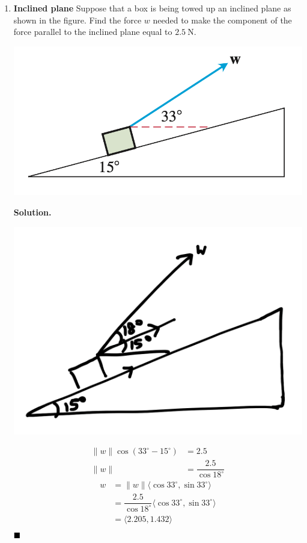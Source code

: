 \documentclass{report}
\begin{document}
\begin{enumerate}
    \item \textbf{Inclined plane} Suppose that a box is being towed up an inclined plane as shown in the figure. Find the force $w$ needed to make the component of the force parallel to the inclined plane equal to $2.5 \mathrm{~N}$.
          \begin{center}
              \includegraphics[scale=0.5]{assets/thomas12.3q26.png}
          \end{center}
          \textbf{Solution. }
          \begin{center}
              \includegraphics[scale=0.4]{assets/thomas12.3q26sol.png}
          \end{center}
          \begin{align*}
              \lVert w \rVert \cos (33^{\circ} - 15^{\circ}) & = 2.5                          \\
              \lVert w \rVert                                & = \dfrac{2.5}{\cos 18^{\circ}}
          \end{align*}
          \begin{align*}
              w & = \lVert w \rVert \langle \cos 33^{\circ}, \sin 33^{\circ} \rangle             \\
                & =\dfrac{2.5}{\cos 18^{\circ}} \langle \cos 33^{\circ}, \sin 33^{\circ} \rangle \\
                & = \langle 2.205, 1.432 \rangle                                                 \\
          \end{align*}
          $\hfill\blacksquare$


\end{enumerate}
\end{document}
